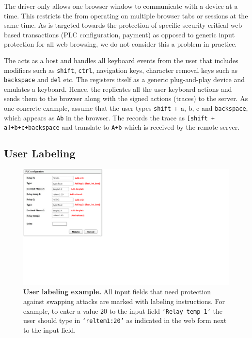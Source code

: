  The \webusb driver only allows one browser window to communicate with a \usb device at a time. This restricts the \device from operating on multiple browser tabs or sessions at the same time. As \name is targeted towards the protection of specific security-critical web-based transactions (PLC configuration, payment) as opposed to generic input protection for all web browsing, we do not consider this a problem in practice.

The \device acts as a \usb host and handles all keyboard events from the user that includes modifiers such as \texttt{shift}, \texttt{ctrl}, navigation keys, character removal keys such as \texttt{backspace} and \texttt{del} etc. The \device registers itself as a generic \usb plug-and-play device and emulates a keyboard. Hence, the \device replicates all the user keyboard actions and sends them to the browser along with the signed actions (traces) to the server. 
%
As one concrete example, assume that the user types \texttt{shift} + a, b, c and \texttt{backspace}, which appears as \texttt{Ab} in the browser. The \device records the trace as \texttt{[shift + a]+b+c+backspace} and translate to \texttt{A+b} which is received by the remote server. 
\subsection{User Labeling}
\label{sec:integriKey:labeling}

\begin{figure}[t]
 \centering
 \includegraphics[trim={0 7cm 20cm 0},clip,width=0.65\linewidth]{chapters/IntegriKey/images/labelExample_revised.pdf}
 \caption[User labeling example]{\textbf{User labeling example.} All input fields that need protection against swapping attacks are marked with labeling instructions. For example, to enter a value 20 to the input field \texttt{`Relay temp 1'} the user should type in \texttt{`reltem1:20'} as indicated in the web form next to the input field.} 
 \vspace{-10pt}
 \label{fig:labelEx}
\end{figure}

